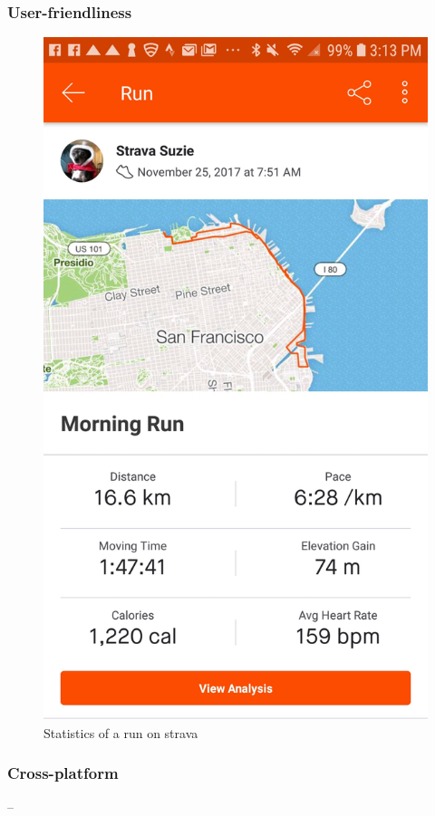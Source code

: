 \subsubsection*{User-friendliness}
\begin{figure}[h]
    \includegraphics[width=\textwidth]{Images/strava-morning-run-stats.jpg}
    \caption{Statistics of a run on strava\cite{strava-run-stats-img}}
\end{figure}
\subsubsection*{Cross-platform} -- 
